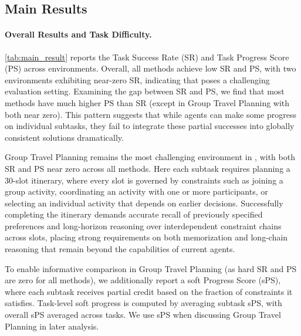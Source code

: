 \subsection{Main Results}
\label{sec:main_analysis}
\paragraph{Overall Results and Task Difficulty.}
\cref{tab:main_result} reports the Task Success Rate (SR) and Task Progress Score (PS) across environments. Overall, all methods achieve low SR and PS, with two environments exhibiting near-zero SR, indicating that \ours poses a challenging evaluation setting. Examining the gap between SR and PS, we find that most methods have much higher PS than SR (except in Group Travel Planning with both near zero). This pattern suggests that while agents can make some progress on individual subtasks, they fail to integrate these partial successes into globally consistent solutions dramatically.



Group Travel Planning remains the most challenging environment in \ours, with both SR and PS near zero across all methods. Here each subtask requires planning a 30-slot itinerary, where every slot is governed by constraints such as joining a group activity, coordinating an activity with one or more participants, or selecting an individual activity that depends on earlier decisions. Successfully completing the itinerary demands accurate recall of previously specified preferences and long-horizon reasoning over interdependent constraint chains across slots, placing strong requirements on both memorization and long-chain reasoning that remain beyond the capabilities of current agents.

To enable informative comparison in Group Travel Planning (as hard SR and PS are zero for all methods), we additionally report a soft Progress Score (sPS), where each subtask receives partial credit based on the fraction of constraints it satisfies. Task-level soft progress is computed by averaging subtask sPS, with overall sPS averaged across tasks. We use sPS when discussing Group Travel Planning in later analysis. 

